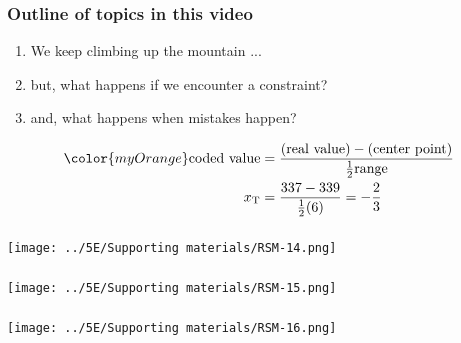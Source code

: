 \begin{frame}\frametitle{Outline of topics in this video}
	\begin{enumerate}
		\item	We keep climbing up the mountain ... \pause
		\item	but, what happens if we encounter a constraint? \pause
		\item	and, what happens when mistakes happen?\pause
	\end{enumerate}
	
	\begin{align*}
		\color{myOrange}\text{coded value} &= \dfrac{(\text{real value}) - (\text{center point})}{\tfrac{1}{2}\text{range}} \\
		x_\text{T} &= \dfrac{337 - 339}{\tfrac{1}{2}(6)} = -\dfrac{2}{3}
	\end{align*}
\end{frame}

\begin{frame}\frametitle{}
	\centerline{\texttt{[image: ../5E/Supporting materials/RSM-14.png]}}
\end{frame}

\begin{frame}\frametitle{}
	\centerline{\texttt{[image: ../5E/Supporting materials/RSM-15.png]}}
\end{frame}

\begin{frame}\frametitle{}
	\centerline{\texttt{[image: ../5E/Supporting materials/RSM-16.png]}}
\end{frame}

